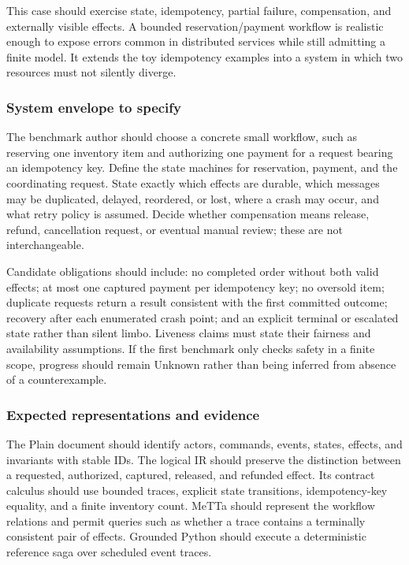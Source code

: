 \documentclass[11pt]{article}
\begin{document}
This case should exercise state, idempotency, partial failure, compensation,
and externally visible effects.  A bounded reservation/payment workflow is
realistic enough to expose errors common in distributed services while still
admitting a finite model.  It extends the toy idempotency examples into a
system in which two resources must not silently diverge.

\subsubsection*{System envelope to specify}

The benchmark author should choose a concrete small workflow, such as
reserving one inventory item and authorizing one payment for a request bearing
an idempotency key.  Define the state machines for reservation, payment, and
the coordinating request.  State exactly which effects are durable, which
messages may be duplicated, delayed, reordered, or lost, where a crash may
occur, and what retry policy is assumed.  Decide whether compensation means
release, refund, cancellation request, or eventual manual review; these are
not interchangeable.

Candidate obligations should include: no completed order without both valid
effects; at most one captured payment per idempotency key; no oversold item;
duplicate requests return a result consistent with the first committed
outcome; recovery after each enumerated crash point; and an explicit terminal
or escalated state rather than silent limbo.  Liveness claims must state their
fairness and availability assumptions.  If the first benchmark only checks
safety in a finite scope, progress should remain Unknown rather than being
inferred from absence of a counterexample.

\subsubsection*{Expected representations and evidence}

The Plain document should identify actors, commands, events, states, effects,
and invariants with stable IDs.  The logical IR should preserve the distinction
between a requested, authorized, captured, released, and refunded effect.  Its
contract calculus should use bounded traces, explicit state transitions,
idempotency-key equality, and a finite inventory count.  MeTTa should represent
the workflow relations and permit queries such as whether a trace contains a
terminally consistent pair of effects.  Grounded Python should execute a
deterministic reference saga over scheduled event traces.
\end{document}

